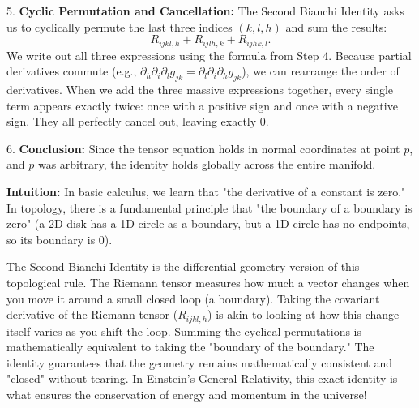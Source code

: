 \begin{solution}
5. \textbf{Cyclic Permutation and Cancellation:}
The Second Bianchi Identity asks us to cyclically permute the last three indices $(k, l, h)$ and sum the results:
\[ R_{ijkl,h} + R_{ijlh,k} + R_{ijhk,l}. \]
We write out all three expressions using the formula from Step 4. Because partial derivatives commute (e.g., $\partial_h \partial_i \partial_l g_{jk} = \partial_l \partial_i \partial_h g_{jk}$), we can rearrange the order of derivatives. When we add the three massive expressions together, every single term appears exactly twice: once with a positive sign and once with a negative sign. They all perfectly cancel out, leaving exactly $0$.
\par\vspace{\baselineskip}

6. \textbf{Conclusion:}
Since the tensor equation holds in normal coordinates at point $p$, and $p$ was arbitrary, the identity holds globally across the entire manifold.
\par\vspace{\baselineskip}

\textbf{Intuition:}
In basic calculus, we learn that "the derivative of a constant is zero." In topology, there is a fundamental principle that "the boundary of a boundary is zero" (a 2D disk has a 1D circle as a boundary, but a 1D circle has no endpoints, so its boundary is 0).
\par\vspace{\baselineskip}

The Second Bianchi Identity is the differential geometry version of this topological rule. The Riemann tensor measures how much a vector changes when you move it around a small closed loop (a boundary). Taking the covariant derivative of the Riemann tensor ($R_{ijkl,h}$) is akin to looking at how this change itself varies as you shift the loop. Summing the cyclical permutations is mathematically equivalent to taking the "boundary of the boundary." The identity guarantees that the geometry remains mathematically consistent and "closed" without tearing. In Einstein's General Relativity, this exact identity is what ensures the conservation of energy and momentum in the universe!
\end{solution}

